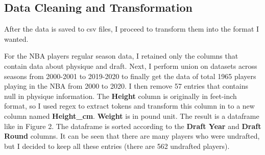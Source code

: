 \documentclass[a4paper,12pt,twoside]{article}
\numberwithin{equation}{section}
\begin{document}
\subsection{Data Cleaning and Transformation}
After the data is saved to csv files, I proceed to transform them into the format I wanted. 

For the NBA players regular season data, I retained only the columns that contain data about physique and draft. Next, I perform union on datasets across seasons from 2000-2001 to 2019-2020 to finally get the data of total 1965 players playing in the NBA from 2000 to 2020. I then remove 57 entries that contains null in physique information. The \textbf{Height} column is originally in feet-inch format, so I used regex to extract tokens and transform this column in to a new column named \textbf{Height\_cm}. \textbf{Weight} is in pound unit.  The result is a dataframe like in Figure 2. The dataframe is sorted according to the \textbf{Draft Year} and \textbf{Draft Round} columns. It can be seen that there are many players who were undrafted, but I decided to keep all these entries (there are 562 undrafted players).
\end{document}
